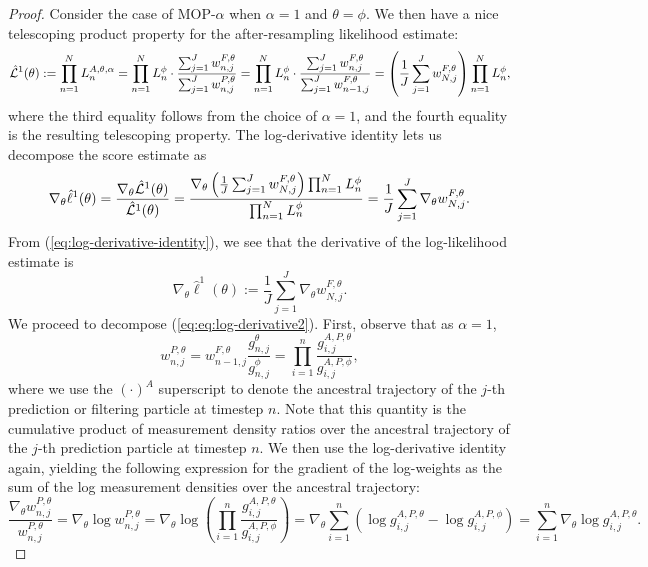 \begin{proof}
    Consider the case of MOP-$\alpha$ when $\alpha=1$ and $\theta=\phi$. We then have a nice telescoping product property for the after-resampling likelihood estimate:
\begin{equation*}
    \hat{\mathcal{L}}^1(\theta) := \prod_{n=1}^N L_n^{A, \theta, \alpha} = \prod_{n=1}^N L_n^\phi \cdot \frac{\sum_{j=1}^J w_{n,j}^{F,\theta}}{\sum_{j=1}^J w_{n,j}^{P,\theta}}= \prod_{n=1}^N L_n^\phi \cdot \frac{\sum_{j=1}^J w_{n,j}^{F,\theta}}{\sum_{j=1}^J w_{n-1,j}^{F,\theta}} = \left(\frac{1}{J}\sum_{j=1}^J w_{N,j}^{F,\theta}\right) \prod_{n=1}^N L_n^\phi,
\end{equation*}
where the third equality follows from the choice of $\alpha=1$, and the fourth equality is the resulting telescoping property. 
The log-derivative identity lets us decompose the score estimate as
\begin{equation}\label{eq:log-derivative-identity}
\nabla_\theta \hat\ell^1(\theta) = \frac{\nabla_\theta \hat{\mathcal{L}}^1(\theta)}{\hat{\mathcal{L}}^1(\theta)} = \frac{\nabla_\theta\left(\frac{1}{J}\sum_{j=1}^J w_{N,j}^{F,\theta}\right) \prod_{n=1}^N L_n^\phi}{\prod_{n=1}^N L_n^\phi} =  \frac{1}{J}\sum_{j=1}^J \nabla_\theta w_{N,j}^{F,\theta}.
\end{equation}
From (\ref{eq:log-derivative-identity}), we see that the derivative of the log-likelihood estimate is
\begin{equation}\label{eq:eq:log-derivative2}
    \nabla_\theta \hat{\ell}^1(\theta) := \frac{1}{J}\sum_{j=1}^J \nabla_\theta w_{N,j}^{F,\theta}.
\end{equation}
We proceed to decompose (\ref{eq:eq:log-derivative2}).
First, observe that as $\alpha=1$,
$$w_{n,j}^{P,\theta} = w_{n-1,j}^{F,\theta}\frac{g_{n,j}^\theta}{g_{n,j}^\phi} = \prod_{i=1}^n \frac{g_{i,j}^{A,P,\theta}}{g_{i,j}^{A,P,\phi}},$$
where we use the $(\cdot)^A$ superscript to denote the ancestral trajectory of the $j$-th prediction or filtering particle at timestep $n$. 
Note that this quantity is the cumulative product of measurement density ratios over the ancestral trajectory of the $j$-th prediction particle at timestep $n$.
We then use the log-derivative identity again, yielding the following expression for the gradient of the log-weights as the sum of the log measurement densities over the ancestral trajectory:
$$\frac{\nabla_\theta w_{n,j}^{P,\theta}}{w_{n,j}^{P,\theta}} = \nabla_\theta \log w_{n,j}^{P,\theta} = \nabla_\theta \log \left(\prod_{i=1}^n \frac{g_{i,j}^{A,P,\theta}}{g_{i,j}^{A,P,\phi}}\right) = \nabla_\theta \sum_{i=1}^n \left(\log g_{i,j}^{A,P,\theta} - \log g_{i,j}^{A,P,\phi}\right) = \sum_{i=1}^n \nabla_\theta \log g_{i,j}^{A,P,\theta}.$$

\end{proof}
